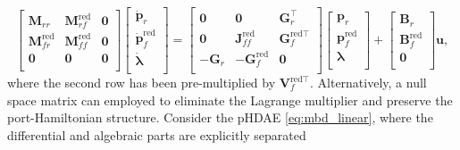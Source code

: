 \begin{equation}
\begin{bmatrix}
\mathbf{M}_{rr} & \mathbf{M}_{rf}^{\text{red}} & \mathbf{0} \\ 
\mathbf{M}_{fr}^{\text{red}} & \mathbf{M}_{ff}^{\text{red}} & \mathbf{0} \\
\mathbf{0} & \mathbf{0} & \mathbf{0} \\
\end{bmatrix}
\begin{bmatrix}
\dot{\mathbf{p}}_r \\ \dot{\mathbf{p}}_f^{\text{red}} \\ \dot{\bm{\lambda}} \\ 
\end{bmatrix} = 
\begin{bmatrix}
\mathbf{0} & \mathbf{0} & \mathbf{G}_r^\top \\ 
\mathbf{0} & \mathbf{J}_{ff}^{\text{red}} & \mathbf{G}_f^{\text{red} \top} \\ 
-\mathbf{G}_r & -\mathbf{G}_f^{\text{red}} & \mathbf{0} \\
\end{bmatrix}
\begin{bmatrix}
\mathbf{p}_r \\ \mathbf{p}_f^{\text{red}} \\ {\bm{\lambda}} \\ 
\end{bmatrix} + 
\begin{bmatrix}
\mathbf{B}_r \\ \mathbf{B}_f^{\text{red}} \\ \mathbf{0} \\
\end{bmatrix}\mathbf{u},
\end{equation}
where the second row has been pre-multiplied by $\mathbf{V}_f^{\text{red} \top}$. Alternatively, a null space matrix can employed to eliminate the Lagrange multiplier and preserve the port-Hamiltonian structure. Consider the pHDAE \eqref{eq:mbd_linear}, where the differential and algebraic parts are explicitly separated


